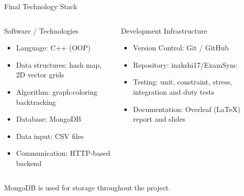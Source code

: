 \documentclass[aspectratio=169,11pt]{beamer}
\newcommand{\smallnote}[1]{%
\vspace{0.08cm}
{\scriptsize\color{GEUGrey}#1}
}
\begin{document}
\begin{frame}{Final Technology Stack}

\begin{columns}[T,totalwidth=\textwidth]


\begin{block}{Software / Technologies}
\begin{itemize}\itemsep2pt
    \small
    \item Language: C++ (OOP)
    \item Data structures: hash map, 2D vector grids
    \item Algorithm: graph-coloring backtracking
    \item Database: MongoDB
    \item Data input: CSV files
    \item Communication: HTTP-based backend
\end{itemize}
\end{block}


\begin{block}{Development Infrastructure}
\begin{itemize}\itemsep2pt
    \small
    \item Version Control: Git / GitHub
    \item Repository: inakshi17/ExamSync
    \item Testing: unit, constraint, stress, integration and duty tests
    \item Documentation: Overleaf (LaTeX) report and slides
\end{itemize}
\end{block}

\end{columns}

\vfill

\smallnote{
MongoDB is used for storage throughout the project.
}

\end{frame}
\end{document}
